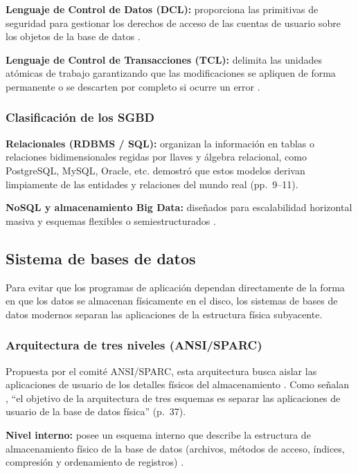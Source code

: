 \textbf{Lenguaje de Control de Datos (DCL):} proporciona las primitivas de seguridad para gestionar los derechos de acceso de las cuentas de usuario sobre los objetos de la base de datos \parencites[p.~19]{elmasri_navathe}[p.~74]{silberschatz_dbconcepts}.

\textbf{Lenguaje de Control de Transacciones (TCL):} delimita las unidades atómicas de trabajo garantizando que las modificaciones se apliquen de forma permanente o se descarten por completo si ocurre un error \parencite[pp.~175--176]{silberschatz_dbconcepts}.

\subsubsection{Clasificación de los SGBD}

\textbf{Relacionales (RDBMS / SQL):} organizan la información en tablas o relaciones bidimensionales regidas por llaves y álgebra relacional, como PostgreSQL, MySQL, Oracle, etc. \textcite{chen_er_model} demostró que estos modelos derivan limpiamente de las entidades y relaciones del mundo real (pp.~9--11).

\textbf{NoSQL y almacenamiento Big Data:} diseñados para escalabilidad horizontal masiva y esquemas flexibles o semiestructurados \parencite[pp.~51--52]{elmasri_navathe}.

\subsection{Sistema de bases de datos}

Para evitar que los programas de aplicación dependan directamente de la forma en que los datos se almacenan físicamente en el disco, los sistemas de bases de datos modernos separan las aplicaciones de la estructura física subyacente.

\subsubsection{Arquitectura de tres niveles (ANSI/SPARC)}

Propuesta por el comité ANSI/SPARC, esta arquitectura busca aislar las aplicaciones de usuario de los detalles físicos del almacenamiento \parencite[p.~36]{elmasri_navathe}. Como señalan \textcite{elmasri_navathe}, \enquote{el objetivo de la arquitectura de tres esquemas es separar las aplicaciones de usuario de la base de datos física} (p.~37).

\textbf{Nivel interno:} posee un esquema interno que describe la estructura de almacenamiento físico de la base de datos (archivos, métodos de acceso, índices, compresión y ordenamiento de registros) \parencite[p.~37]{elmasri_navathe}.

